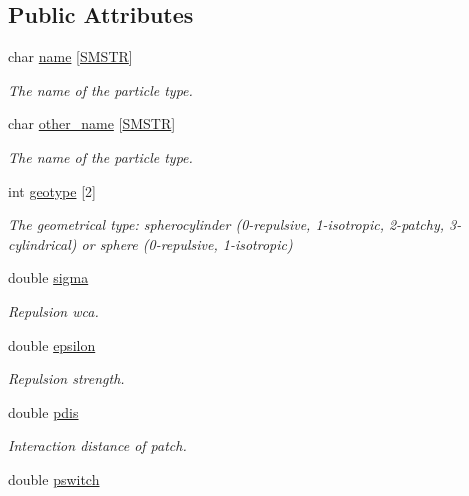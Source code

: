 \subsection*{Public Attributes}
\begin{DoxyCompactItemize}
\item 
char \hyperlink{class_ia__param_a93db89588de0ca8555f7b312424161db}{name} \mbox{[}\hyperlink{macros_8h_aa7445b8b5da5275d3f14a3ac4416ca77}{S\+M\+S\+T\+R}\mbox{]}
\begin{DoxyCompactList}\small\item\em The name of the particle type. \end{DoxyCompactList}\item 
char \hyperlink{class_ia__param_afd6e54f0e156fdbcb2c3a7a21867c147}{other\+\_\+name} \mbox{[}\hyperlink{macros_8h_aa7445b8b5da5275d3f14a3ac4416ca77}{S\+M\+S\+T\+R}\mbox{]}
\begin{DoxyCompactList}\small\item\em The name of the particle type. \end{DoxyCompactList}\item 
int \hyperlink{class_ia__param_a3ff31140f1898b4792a39745eec89a2e}{geotype} \mbox{[}2\mbox{]}
\begin{DoxyCompactList}\small\item\em The geometrical type\+: spherocylinder (0-\/repulsive, 1-\/isotropic, 2-\/patchy, 3-\/cylindrical) or sphere (0-\/repulsive, 1-\/isotropic) \end{DoxyCompactList}\item 
double \hyperlink{class_ia__param_aafb540d04d54bd58140378a84f94b81d}{sigma}
\begin{DoxyCompactList}\small\item\em Repulsion wca. \end{DoxyCompactList}\item 
double \hyperlink{class_ia__param_afc12bb1527874046f8d8a5769493b142}{epsilon}
\begin{DoxyCompactList}\small\item\em Repulsion strength. \end{DoxyCompactList}\item 
double \hyperlink{class_ia__param_a63ddf4536d542af40513d4c057fc63d8}{pdis}
\begin{DoxyCompactList}\small\item\em Interaction distance of patch. \end{DoxyCompactList}\item 
double \hyperlink{class_ia__param_a472503a5c3cb1e523fab0fba256b6908}{pswitch}

\end{DoxyCompactItemize}
